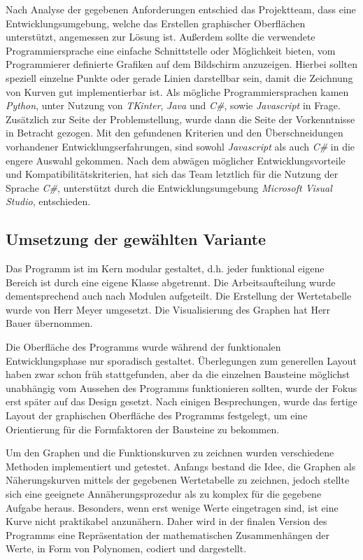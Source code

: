 \documentclass[a4paper]{article}
\begin{document}
    Nach Analyse der gegebenen Anforderungen entschied das Projektteam, dass eine Entwicklungsumgebung, welche das Erstellen graphischer Oberflächen unterstützt, angemessen zur Lösung ist.
    Außerdem sollte die verwendete Programmiersprache eine einfache Schnittstelle oder Möglichkeit bieten, vom Programmierer definierte Grafiken auf dem Bildschirm anzuzeigen.
    Hierbei sollten speziell einzelne Punkte oder gerade Linien darstellbar sein, damit die Zeichnung von Kurven gut implementierbar ist.
    Als mögliche Programmiersprachen kamen \textit{\glqq Python\grqq{}}, unter Nutzung von \textit{\glqq TKinter\grqq{}}, \textit{\glqq Java\grqq{}} und \textit{\glqq C\#\grqq{}}, sowie \textit{\glqq Javascript\grqq{}} in Frage.
    Zusätzlich zur Seite der Problemstellung, wurde dann die Seite der Vorkenntnisse in Betracht gezogen.
    Mit den gefundenen Kriterien und den Überschneidungen vorhandener Entwicklungserfahrungen, sind sowohl \textit{\glqq Javascript\grqq{}} als auch \textit{\glqq C\#\grqq{}} in die engere Auswahl gekommen.
    Nach dem abwägen möglicher Entwicklungsvorteile und Kompatibilitätskriterien, hat sich das Team letztlich für die Nutzung der Sprache \textit{\glqq C\#\grqq{}}, unterstützt durch die Entwicklungsumgebung \textit{\glqq Microsoft Visual Studio\grqq{}}, entschieden.

\subsection{Umsetzung der gewählten Variante}

    Das Programm ist im Kern modular gestaltet, d.h. jeder funktional eigene Bereich ist durch eine eigene Klasse abgetrennt.
    Die Arbeitsaufteilung wurde dementsprechend auch nach Modulen aufgeteilt.
    Die Erstellung der Wertetabelle wurde von Herr Meyer umgesetzt.
    Die Visualisierung des Graphen hat Herr Bauer übernommen.

    Die Oberfläche des Programms wurde während der funktionalen Entwicklungsphase nur sporadisch gestaltet.
    Überlegungen zum generellen Layout haben zwar schon früh stattgefunden, aber da die einzelnen Bausteine möglichst unabhängig vom Aussehen des Programms funktionieren sollten, wurde der Fokus erst später auf das Design gesetzt.
    Nach einigen Besprechungen, wurde das fertige Layout der graphischen Oberfläche des Programms festgelegt, um eine Orientierung für die Formfaktoren der Bausteine zu bekommen.

    Um den Graphen und die Funktionskurven zu zeichnen wurden verschiedene Methoden implementiert und getestet.
    Anfangs bestand die Idee, die Graphen als Näherungskurven mittels der gegebenen Wertetabelle zu zeichnen, jedoch stellte sich eine geeignete Annäherungsprozedur als zu komplex für die gegebene Aufgabe heraus.
    Besonders, wenn erst wenige Werte eingetragen sind, ist eine Kurve nicht praktikabel anzunähern.
    Daher wird in der finalen Version des Programms eine Repräsentation der mathematischen Zusammenhängen der Werte, in Form von Polynomen, codiert und dargestellt.
\end{document}
